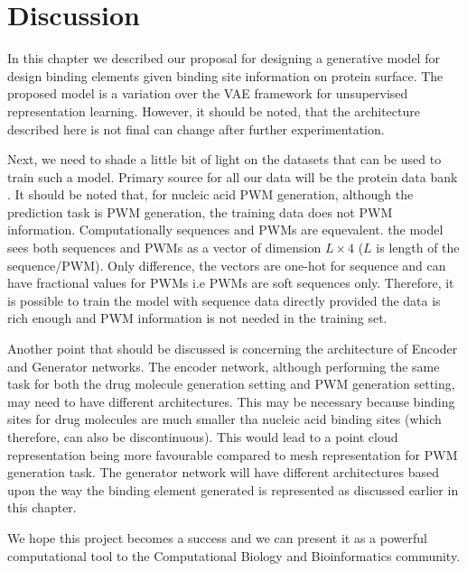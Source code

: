 \section{Discussion}
In this chapter we described our proposal for designing a generative model for design binding
elements given binding site information on protein surface. The proposed model is a variation over the VAE
framework \citep{Kingma2014} for unsupervised representation learning. However, it should be noted,
that the architecture described here is not final can change after further experimentation.

Next, we need to shade a little bit of light on the datasets that can be used to train such a model.
Primary source for all our data will be the protein data bank \citep{berman2000protein}. It should
be noted that, for nucleic acid PWM generation, although the prediction task is PWM generation, the
training data does not PWM information. Computationally sequences and PWMs are equevalent. the model
sees both sequences and PWMs as a vector of dimension $L \times 4$ ($L$ is length of the
sequence/PWM). Only difference, the vectors are one-hot for sequence and can have fractional values
for PWMs i.e PWMs are soft sequences only. Therefore, it is possible to train the model with
sequence data directly provided the data is rich enough and PWM information is not needed in the
training set. 

Another point that should be discussed is concerning the architecture of Encoder and Generator
networks. The encoder network, although performing the same task for both the drug molecule
generation setting and PWM generation setting, may need to have different architectures. This may be necessary because binding sites for drug molecules are much smaller tha
nucleic acid binding sites (which therefore, can also be discontinuous). This would lead to a point
cloud representation being more favourable compared to mesh representation for PWM generation task.
The generator network will have different architectures based upon the way the binding element
generated is represented as discussed earlier in this chapter.

We hope this project becomes a success and we can present it as a powerful computational tool to the
Computational Biology and Bioinformatics community.
